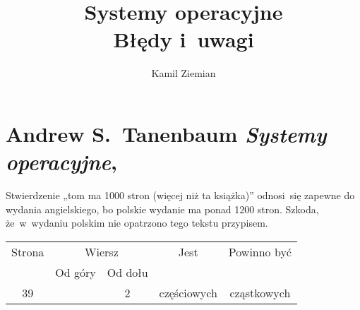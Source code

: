 \documentclass[a4paper,11pt]{article}
\title{Systemy operacyjne \\
  {\Large Błędy i~uwagi}}
\author{Kamil Ziemian}
\numberwithin{equation}{section}
\begin{document}





\maketitle





\section{Andrew S.~Tanenbaum \textit{Systemy operacyjne},
  \cite{TannenbaumSystemyOperacyjneWydanieIII2013}}

\label{sec:Tanenbaum-Systemy-operacyjne}




\noindent
{} Stwierdzenie „tom ma 1000 stron (więcej niż ta
książka)” odnosi~się zapewne do wydania angielskiego, bo polskie wydanie ma
ponad 1200 stron. Szkoda, że~w~wydaniu polskim nie opatrzono tego tekstu
przypisem.




\begin{center}

  \begin{tabular}{|c|c|c|c|c|}
    \hline
    Strona & \multicolumn{2}{c|}{Wiersz} & Jest
    & Powinno być \\ \cline{2-3}
           & Od góry & Od dołu & & \\
    \hline
    39 & & \hphantom{0}2 & częściowych & cząstkowych \\
    \hline
  \end{tabular}

\end{center}

\VerSpaceSix















{}






\end{document}

